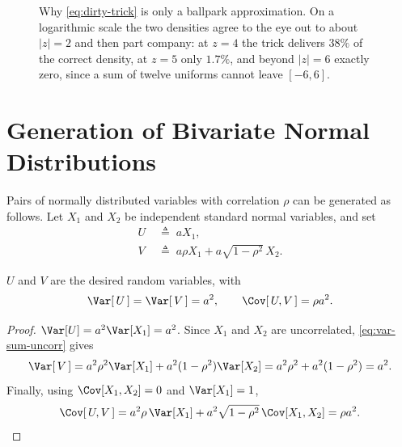 \begin{figure}[H]
	\caption{Why \eqref{eq:dirty-trick} is only a ballpark approximation. On a
		logarithmic scale the two densities agree to the eye out to about
		$|z|=2$ and then part company: at $z=4$ the trick delivers $38\%$ of the
		correct density, at $z=5$ only $1.7\%$, and beyond $|z|=6$ exactly zero,
		since a sum of twelve uniforms cannot leave $[-6,6]$.}
	\label{fig:dirty-trick}
\end{figure}
\suppend

\section{Generation of Bivariate Normal Distributions}
\label{sec:gen-bivariate}


Pairs of normally distributed variables with correlation $\rho$ can be generated as follows.
Let $X_{1}$ and $X_{2}$ be independent standard normal variables, and set
\begin{equation}
	\begin{aligned}
		U & \;\triangleq\; aX_{1} ,                                   \\
		V & \;\triangleq\; a\rho X_{1} + a\sqrt{1-\rho^{2}}\,X_{2} .
	\end{aligned}\label{eq:bivariate-def}
\end{equation}


\begin{proposition}
	$U$ and $V$ are the desired random variables, with
	\[
		\Var[\,U\,] = \Var[\,V\,] = a^{2} ,
		\qquad
		\Cov[\,U,V\,] = \rho a^{2} .
	\]
\end{proposition}

\suppstart
\begin{proof}
	$\Var[U]=a^{2}\Var[X_{1}]=a^{2}$.
	Since $X_{1}$ and $X_{2}$ are uncorrelated, \eqref{eq:var-sum-uncorr} gives
	\[
		\Var[\,V\,] = a^{2}\rho^{2}\Var[X_{1}] + a^{2}(1-\rho^{2})\Var[X_{2}] = a^{2}\rho^{2}+a^{2}(1-\rho^{2}) = a^{2} .
	\]
	Finally, using $\Cov[X_{1},X_{2}]=0$ and $\Var[X_{1}]=1$,
	\[
		\Cov[\,U,V\,] = a^{2}\rho\,\Var[X_{1}] + a^{2}\sqrt{1-\rho^{2}}\,\Cov[X_{1},X_{2}] = \rho a^{2} . \qedhere
	\]
\end{proof}
\suppend

